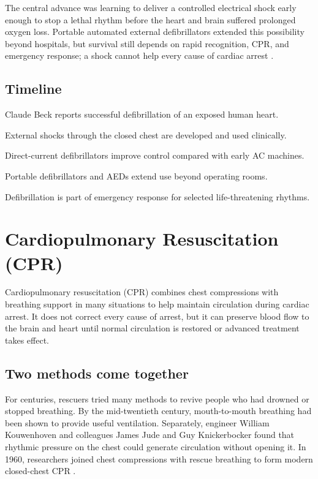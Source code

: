 \documentclass[12pt,oneside]{book}
\begin{document}
The central advance was learning to deliver a controlled electrical shock
early enough to stop a lethal rhythm before the heart and brain suffered
prolonged oxygen loss. Portable automated external defibrillators extended
this possibility beyond hospitals, but survival still depends on rapid
recognition, CPR, and emergency response; a shock cannot help every cause of
cardiac arrest \cite{ahaCprHistory,defibrillationHistory}.

\section*{Timeline}
\begin{description}[leftmargin=2.3cm,style=nextline]
  \item[1947] Claude Beck reports successful defibrillation of an exposed human heart.
  \item[1950s] External shocks through the closed chest are developed and used clinically.
  \item[1960s] Direct-current defibrillators improve control compared with early AC machines.
  \item[1970s onward] Portable defibrillators and AEDs extend use beyond operating rooms.
  \item[Today] Defibrillation is part of emergency response for selected life-threatening rhythms.
\end{description}
\chapter[Cardiopulmonary Resuscitation (CPR)]{Cardiopulmonary Resuscitation (CPR)}

Cardiopulmonary resuscitation (CPR) combines chest compressions with
breathing support in many situations to help maintain circulation during
cardiac arrest. It does not correct every cause of arrest, but it can
preserve blood flow to the brain and heart until normal circulation is
restored or advanced treatment takes effect.

\section{Two methods come together}
For centuries, rescuers tried many methods to revive people who had
drowned or stopped breathing. By the mid-twentieth century, mouth-to-mouth
breathing had been shown to provide useful ventilation. Separately,
engineer William Kouwenhoven and colleagues James Jude and Guy Knickerbocker
found that rhythmic pressure on the chest could generate circulation
without opening it. In 1960, researchers joined chest compressions with
rescue breathing to form modern closed-chest CPR
\cite{ahaCprHistory,cprHistoryReview}.
\end{document}
